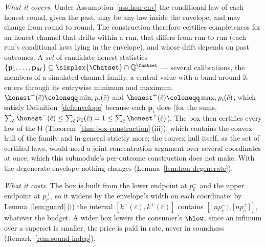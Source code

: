 
\begin{remark}\label{rem:envelope}
\emph{What it covers.} Under Assumption~\ref{ass:hon-env} the conditional law
of each honest round, given the past, may be any law inside the envelope, and
may change from round to round. The construction therefore certifies
completeness for an honest channel that drifts within a run, that differs
from run to run (each run's conditional laws lying in the envelope), and
whose drift depends on past outcomes. A \emph{set} of candidate honest
statistics
$\{\mathbf{p}_1,\dots,\mathbf{p}_M\}\subseteq\simplex{\Chatset}\cap\mathbb{Q}^{\Chatset}$
--- several calibrations, the members of a simulated channel family, a
central value with a band around it --- enters through its entrywise minimum
and maximum, ${\honest}^{-}(\hat c)\coloneqq\min_i p_i(\hat c)$ and
${\honest}^{+}(\hat c)\coloneqq\max_i p_i(\hat c)$, which satisfy
Definition~\ref{def:envelope} because each $\mathbf{p}_i$ does (for the sums,
$\sum_{\hat c}{\honest}^{-}(\hat c)\le\sum_{\hat c}p_1(\hat c)=1\le
\sum_{\hat c}{\honest}^{+}(\hat c)$). The box then certifies every law of the
 $\mathsf{H}$ (Theorem~\ref{thm:box-construction}\,(iii)), which
contains the convex hull of the family and in general strictly more; the
convex hull itself, as the set of certified laws, would need a joint
concentration argument over several coordinates at once, which this
submodule's per-outcome construction does not make. With the degenerate
envelope nothing changes (Lemma~\ref{lem:hon-degenerate}).

\emph{What it costs.} The box is built from the lower endpoint at
$p^{-}_{\hat c}$ and the upper endpoint at $p^{+}_{\hat c}$, so it widens by
the envelope's width on each coordinate: by Lemma~\ref{lem:guard}\,(i) the
interval $[k^{-}(\hat c),k^{+}(\hat c)]$ contains
$[\lfloor np^{-}_{\hat c}\rfloor,\lceil np^{+}_{\hat c}\rceil]$, whatever the
budget. A wider box lowers the consumer's $\hlow$, since an infimum over a
superset is smaller; the price is paid in rate, never in soundness
(Remark~\ref{rem:sound-indep}).


\end{remark}
